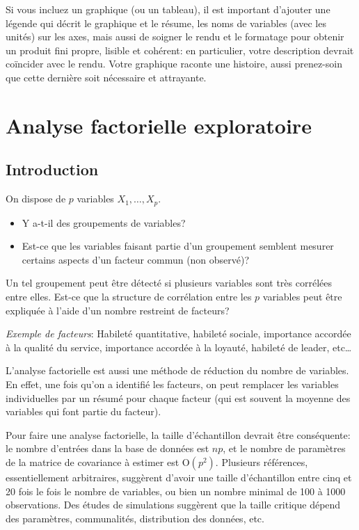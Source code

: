 \documentclass[
  11pt,
  letterpaper,
]{book}
\providecommand{\tightlist}{%
  \setlength{\itemsep}{0pt}\setlength{\parskip}{0pt}}
\theoremstyle{definition}
\theoremstyle{definition}
\theoremstyle{definition}
\theoremstyle{remark}
\begin{document}
Si vous incluez un graphique (ou un tableau), il est important d'ajouter une légende qui décrit le graphique et le résume, les noms de variables (avec les unités) sur les axes, mais aussi de soigner le rendu et le formatage pour obtenir un produit fini propre, lisible et cohérent: en particulier, votre description devrait coïncider avec le rendu. Votre graphique raconte une histoire, aussi prenez-soin que cette dernière soit nécessaire et attrayante.

\hypertarget{analyse-factorielle}{%
\chapter{Analyse factorielle exploratoire}\label{analyse-factorielle}}

\hypertarget{introduction-1}{%
\section{Introduction}\label{introduction-1}}

On dispose de \(p\) variables \(X_1, \ldots, X_p\).

\begin{itemize}
\tightlist
\item
  Y a-t-il des groupements de variables?
\item
  Est-ce que les variables faisant partie d'un groupement semblent mesurer certains aspects d'un facteur commun (non observé)?
\end{itemize}

Un tel groupement peut être détecté si plusieurs variables sont très corrélées entre elles. Est-ce que la structure de corrélation entre les \(p\) variables peut être expliquée à l'aide d'un nombre restreint de facteurs?

\emph{Exemple de facteurs}: Habileté quantitative, habileté sociale, importance accordée à la qualité du service, importance accordée à la loyauté, habileté de leader, etc\ldots

L'analyse factorielle est aussi une méthode de réduction du nombre de variables. En effet, une fois qu'on a identifié les facteurs, on peut remplacer les variables individuelles par un résumé pour chaque facteur (qui est souvent la moyenne des variables qui font partie du facteur).

Pour faire une analyse factorielle, la taille d'échantillon devrait être conséquente: le nombre d'entrées dans la base de données est \(np\), et le nombre de paramètres de la matrice de covariance à estimer est \(\mathrm{O}(p^2)\). Plusieurs références, essentiellement arbitraires, suggèrent d'avoir une taille d'échantillon entre cinq et 20 fois le fois le nombre de variables, ou bien un nombre minimal de 100 à 1000 observations. Des études de simulations suggèrent que la taille critique dépend des paramètres, communalités, distribution des données, etc.
\end{document}

